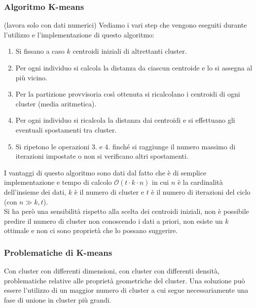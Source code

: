 \subsubsection{Algoritmo K-means}(lavora solo con dati numerici)
Vediamo i vari step che vengono eseguiti durante l'utilizzo e l'implementazione di questo algoritmo:
\begin{enumerate}
    \item  Si fissano a caso $k$ centroidi iniziali di altrettanti cluster.
    \item  Per ogni individuo si calcola la distanza da ciascun centroide e lo si assegna al più vicino.
    \item  Per la partizione provvisoria così ottenuta si ricalcolano i centroidi di ogni cluster (media aritmetica).
    \item  Per ogni individuo si ricalcola la distanza dai centroidi e si effettuano gli eventuali spostamenti tra cluster.
    \item  Si ripetono le operazioni 3. e 4. finché si raggiunge il numero massimo di iterazioni impostate o non si verificano altri spostamenti.
\end{enumerate}
I vantaggi di questo algoritmo sono dati dal fatto che è di semplice implementazione e tempo di calcolo $\mathcal{O}(t\cdot k \cdot n)$ in cui $n$ è la cardinalità dell’insieme dei dati, $k$ è il numero di cluster e $t$ è il numero di iterazioni del ciclo (con $n \gg k, t$).\\
Si ha però una sensibilità rispetto alla scelta dei centroidi iniziali, non è possibile predire il numero di cluster non conoscendo i dati a priori, non esiste un $k$ ottimale e non ci sono proprietà che lo possano suggerire.\\
\subsubsection{Problematiche di K-means}
Con cluster con differenti dimensioni, con cluster con differenti densità, problematiche relative alle proprietà geometriche del cluster.
Una soluzione può essere l’utilizzo di un maggior numero di cluster a cui segue necessariamente una fase di unione in cluster più grandi.
